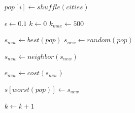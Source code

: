 \documentclass[letterpaper, 11 pt]{article}
\begin{document}
\begin{algorithmic}

	\STATE $pop[i] \gets shuffle(cities)$
\ENDWHILE

\STATE $\epsilon \gets 0.1$
\STATE $k \gets 0$
\STATE $k_{max} \gets 500$


			\STATE $s_{new} \gets best(pop)$
		\ELSE
			\STATE $s_{new} \gets random(pop)$
		\ENDIF
		
		\STATE $s_{new} \gets neighbor(s_{new})$
		
		\STATE $e_{new} \gets cost(s_{new})$
		
			\STATE $s[worst(pop)] \gets s_{new}$
		\ENDIF

		\STATE $k \gets k + 1$
		
\ENDWHILE
\end{algorithmic}












\end{document}
